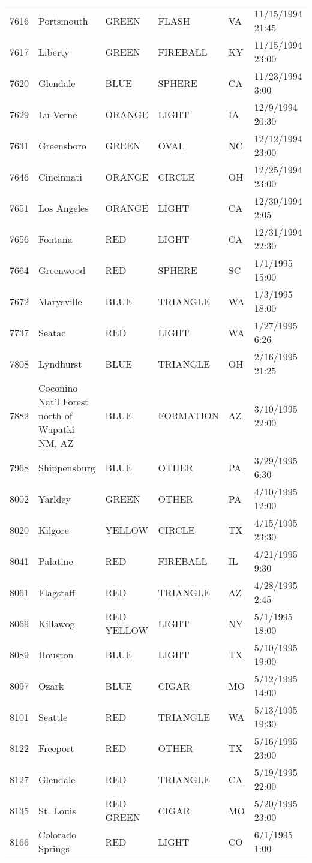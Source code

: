 \begin{tabular}{llllll}
7616 & Portsmouth & GREEN & FLASH & VA & 11/15/1994 21:45 \\
7617 & Liberty & GREEN & FIREBALL & KY & 11/15/1994 23:00 \\
7620 & Glendale & BLUE & SPHERE & CA & 11/23/1994 3:00 \\
7629 & Lu Verne & ORANGE & LIGHT & IA & 12/9/1994 20:30 \\
7631 & Greensboro & GREEN & OVAL & NC & 12/12/1994 23:00 \\
7646 & Cincinnati & ORANGE & CIRCLE & OH & 12/25/1994 23:00 \\
7651 & Los Angeles & ORANGE & LIGHT & CA & 12/30/1994 2:05 \\
7656 & Fontana & RED & LIGHT & CA & 12/31/1994 22:30 \\
7664 & Greenwood & RED & SPHERE & SC & 1/1/1995 15:00 \\
7672 & Marysville & BLUE & TRIANGLE & WA & 1/3/1995 18:00 \\
7737 & Seatac & RED & LIGHT & WA & 1/27/1995 6:26 \\
7808 & Lyndhurst & BLUE & TRIANGLE & OH & 2/16/1995 21:25 \\
7882 & Coconino Nat'l Forest north of Wupatki NM, AZ & BLUE & FORMATION & AZ & 3/10/1995 22:00 \\
7968 & Shippensburg & BLUE & OTHER & PA & 3/29/1995 6:30 \\
8002 & Yarldey & GREEN & OTHER & PA & 4/10/1995 12:00 \\
8020 & Kilgore & YELLOW & CIRCLE & TX & 4/15/1995 23:30 \\
8041 & Palatine & RED & FIREBALL & IL & 4/21/1995 9:30 \\
8061 & Flagstaff & RED & TRIANGLE & AZ & 4/28/1995 2:45 \\
8069 & Killawog & RED YELLOW & LIGHT & NY & 5/1/1995 18:00 \\
8089 & Houston & BLUE & LIGHT & TX & 5/10/1995 19:00 \\
8097 & Ozark & BLUE & CIGAR & MO & 5/12/1995 14:00 \\
8101 & Seattle & RED & TRIANGLE & WA & 5/13/1995 19:30 \\
8122 & Freeport & RED & OTHER & TX & 5/16/1995 23:00 \\
8127 & Glendale & RED & TRIANGLE & CA & 5/19/1995 22:00 \\
8135 & St. Louis & RED GREEN & CIGAR & MO & 5/20/1995 23:00 \\
8166 & Colorado Springs & RED & LIGHT & CO & 6/1/1995 1:00 \\

\end{tabular}
